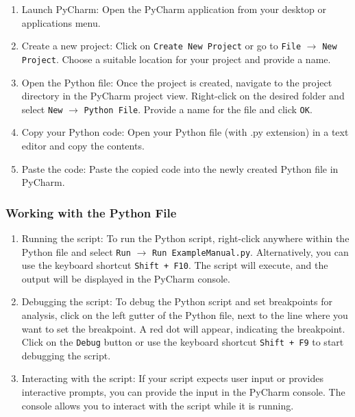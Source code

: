 \begin{enumerate}
	
	\item Launch PyCharm: Open the PyCharm application from your desktop or applications menu.
	
	\item Create a new project: Click on \texttt{Create New Project} or go to \texttt{File} $\rightarrow$ \texttt{New Project}. Choose a suitable location for your project and provide a name.
	
	\item Open the Python file: Once the project is created, navigate to the project directory in the PyCharm project view. Right-click on the desired folder and select \texttt{New} $\rightarrow$ \texttt{Python File}. Provide a name for the file and click \texttt{OK}.
	
	\item Copy your Python code: Open your Python file (with .py extension) in a text editor and copy the contents.
	
	\item Paste the code: Paste the copied code into the newly created Python file in PyCharm.
	
\end{enumerate}

\subsubsection{Working with the Python File}

\begin{enumerate}
	
	\item Running the script: To run the Python script, right-click anywhere within the Python file and select \texttt{Run} $\rightarrow$ \texttt{Run ExampleManual.py}. Alternatively, you can use the keyboard shortcut \texttt{Shift + F10}. The script will execute, and the output will be displayed in the PyCharm console.
	
	\item Debugging the script: To debug the Python script and set breakpoints for analysis, click on the left gutter of the Python file, next to the line where you want to set the breakpoint. A red dot will appear, indicating the breakpoint. Click on the \texttt{Debug} button or use the keyboard shortcut \texttt{Shift + F9} to start debugging the script.
	
	\item Interacting with the script: If your script expects user input or provides interactive prompts, you can provide the input in the PyCharm console. The console allows you to interact with the script while it is running.
	
\end{enumerate}

